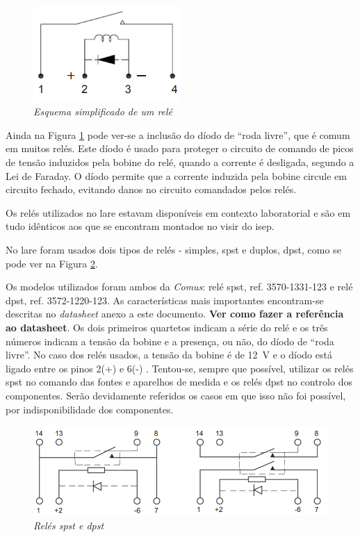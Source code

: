 \begin{figure}[hbtp]
	\centering
	\includegraphics[width=0.5\textwidth]{figures/esquematico_rele.png}
	\caption{\textit{Esquema simplificado de um relé \cite{DryRelay}}}
	\label{fig:esquematicoreles}
\end{figure}

Ainda na Figura \ref{fig:esquematicoreles} pode ver-se a inclusão do díodo de ``roda livre'', que é comum em muitos relés. Este díodo é usado para proteger o circuito de comando de picos de tensão induzidos pela bobine do relé, quando a corrente é desligada, segundo a Lei de Faraday. O díodo permite que a corrente induzida pela bobine circule em circuito fechado, evitando danos no circuito comandados pelos relés.

Os relés utilizados no \acrshort{lare} estavam disponíveis em contexto laboratorial e são em tudo idênticos aos que se encontram montados no \acrshort{visir}  do \acrshort{isep}.

No \acrshort{lare} foram usados dois tipos de relés - simples, \acrfull{spst} e duplos, \acrfull{dpst}, como se pode ver na Figura \ref {fig:reles}.

Os modelos utilizados foram ambos da \textit{Comus}: relé \acrshort{spst}, ref. 3570-1331-123 e relé \acrshort{dpst}, ref. 3572-1220-123. As características mais importantes encontram-se descritas no \textit{datasheet} anexo a este documento. \textbf{Ver como fazer a referência ao datasheet}. Os dois primeiros quartetos indicam a série do relé e os três números indicam a tensão da bobine e a presença, ou não, do díodo de ``roda livre''. No caso dos relés usados, a tensão da bobine é de \SI{12}{\volt} e o díodo está ligado entre os pinos 2(+) e 6(-) \cite{DryRelay}. Tentou-se, sempre que possível, utilizar os relés \acrshort{spst} no comando das fontes e aparelhos de medida e os relés \acrshort{dpst} no controlo dos componentes. Serão devidamente referidos os casos em que isso não foi possível, por indisponibilidade dos componentes.

\begin{figure}[hbtp]
	\centering
	\includegraphics[width=1\textwidth]{figures/reles.png}
	\caption{\textit{Relés \acrshort{spst} e \acrshort{dpst}} \cite{DryRelay}}
	\label{fig:reles}
\end{figure}


